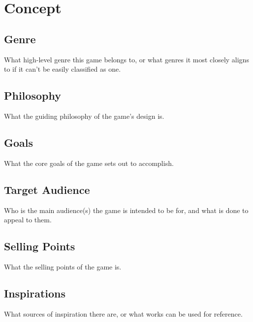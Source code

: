

\newcommand{\gddTitle}{Game Name}
\newcommand{\gddSubtitle}{Game Subtitle}
\newcommand{\gddCompany}{Company Name}
\newcommand{\gddAuthors}{Firstname Lastname, Firstname Lastname, Firstname Lastname}
\newcommand{\gddDate}{January 1st, 1960}
\newcommand{\gddVersion}{1.0.0}

\newcommand{\gddChangelogEntries}{
\gddChangelogEntry{0.1.0}{January 1st, 1960}{
Changelog List\begin{itemize}
\item Point A
\item Point B
\item Point C
\end{itemize}}
\gddChangelogEntry{0.0.1}{January 1st, 1960}{Changelog Modified}
\gddChangelogEntry{0.0.0}{January 1st, 1960}{Changelog Created}
}



\gddTitlepage
\gddChangelog
\tableofcontents

\section{Concept}
\subsection{Genre}
What high-level genre this game belongs to, or what genres it most closely aligns to if it can't be easily classified as one.
\subsection{Philosophy}
What the guiding philosophy of the game's design is.
\subsection{Goals}
What the core goals of the game sets out to accomplish.
\subsection{Target Audience}
Who is the main audience(s) the game is intended to be for, and what is done to appeal to them.
\subsection{Selling Points}
What the selling points of the game is.
\subsection{Inspirations}
What sources of inspiration there are, or what works can be used for reference.
